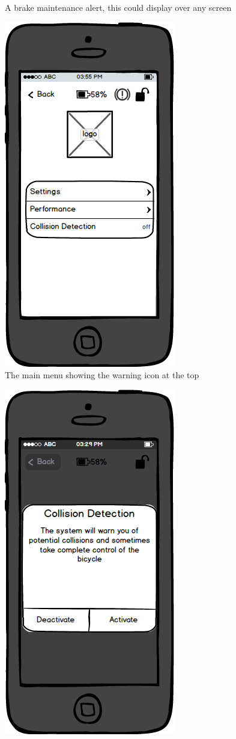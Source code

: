 \documentclass[a4paper]{report}
\begin{document}
{\begin{figure}
\caption{A brake maintenance alert, this could display over any screen}
\end{figure}
\clearpage
\begin{figure}
\centering
\includegraphics[scale=0.9]{figures/prototype_1/main_menu_warn}
\caption{The main menu showing the warning icon at the top}
\end{figure}
\clearpage
\begin{figure}
\centering
\includegraphics[scale=0.8]{figures/prototype_1/collision_activate}

\end{figure}}
\end{document}
